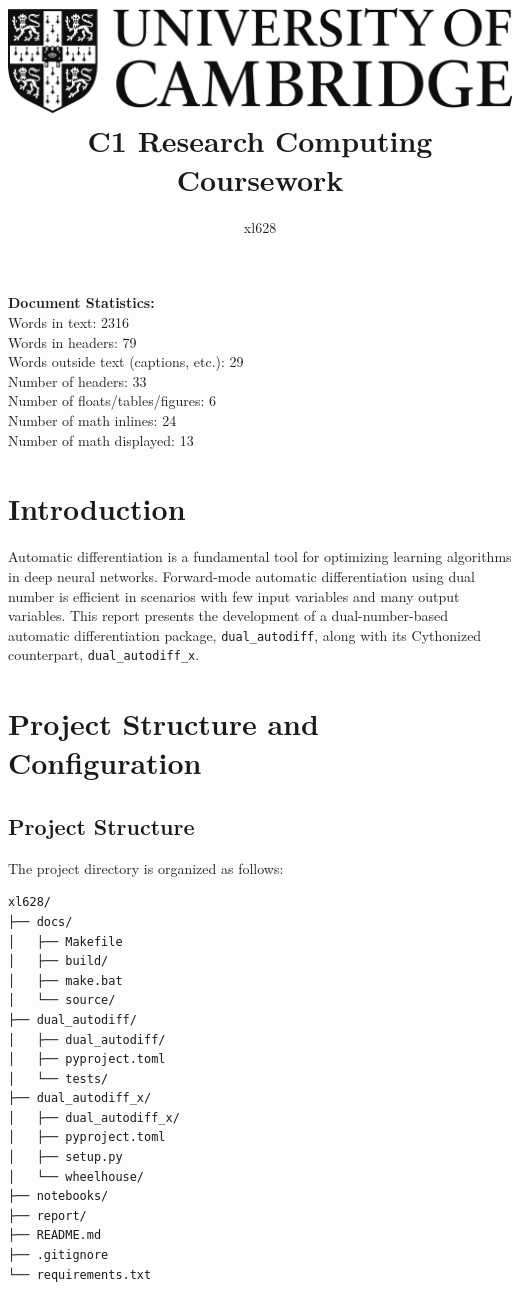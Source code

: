 \documentclass{article}
\title{
\includegraphics[scale=0.2]{Cam_logo_bw.png}\\
\vspace{0.5cm}
C1 Research Computing Coursework
}
\author{xl628}
\affil{Department of Physics, University of Cambridge}
\begin{document}
\maketitle

\vspace{1cm}
\noindent
\textbf{Document Statistics:} \\
Words in text: 2316 \\
Words in headers: 79 \\
Words outside text (captions, etc.): 29 \\
Number of headers: 33 \\
Number of floats/tables/figures: 6 \\
Number of math inlines: 24 \\
Number of math displayed: 13

\section{Introduction}
Automatic differentiation is a fundamental tool for optimizing learning algorithms in deep neural networks. Forward-mode automatic differentiation using dual number is efficient in scenarios with few input variables and many output variables. This report presents the development of a dual-number-based automatic differentiation package, \texttt{dual\_autodiff}, along with its Cythonized counterpart, \texttt{dual\_autodiff\_x}. 

\section{Project Structure and Configuration}

\subsection{Project Structure}

The project directory is organized as follows:

\begin{verbatim}
xl628/
├── docs/
│   ├── Makefile
│   ├── build/
│   ├── make.bat
│   └── source/
├── dual_autodiff/
│   ├── dual_autodiff/
│   ├── pyproject.toml
│   └── tests/
├── dual_autodiff_x/
│   ├── dual_autodiff_x/
│   ├── pyproject.toml
│   ├── setup.py
│   └── wheelhouse/
├── notebooks/
├── report/
├── README.md
├── .gitignore
└── requirements.txt
\end{verbatim}
\end{document}
